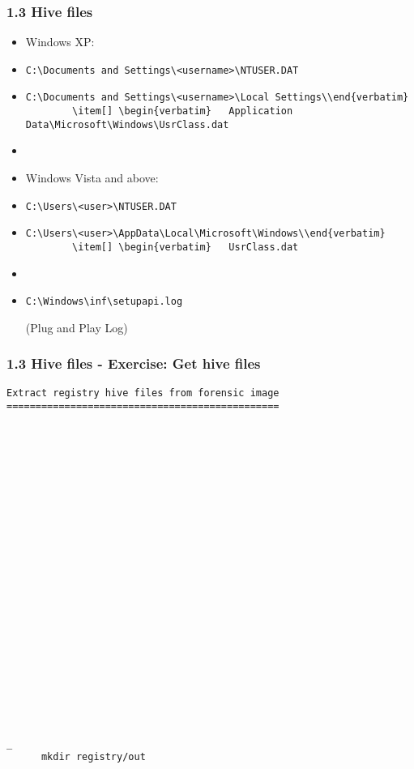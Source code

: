\begin{frame}[fragile]
  \frametitle{1.3 Hive files}
    \begin{itemize}
        \item Windows XP:
        \item[] \begin{verbatim}C:\Documents and Settings\<username>\NTUSER.DAT\end{verbatim}
        \item[] \begin{verbatim}C:\Documents and Settings\<username>\Local Settings\\end{verbatim}
        \item[] \begin{verbatim}   Application Data\Microsoft\Windows\UsrClass.dat\end{verbatim}
        \item[]
        \item Windows Vista and above:
        \item[] \begin{verbatim}C:\Users\<user>\NTUSER.DAT\end{verbatim}
        \item[] \begin{verbatim}C:\Users\<user>\AppData\Local\Microsoft\Windows\\end{verbatim}
        \item[] \begin{verbatim}   UsrClass.dat\end{verbatim}
        \item[]
	\item \begin{verbatim}C:\Windows\inf\setupapi.log\end{verbatim} (Plug and Play Log)
    \end{itemize}
\end{frame}






\begin{frame}[fragile]
  \frametitle{1.3 Hive files - Exercise: Get hive files}
    \begin{lstlisting}[basicstyle=\tiny]
Extract registry hive files from forensic image
===============================================
























_
      mkdir registry/out
    \end{lstlisting}
\end{frame}


